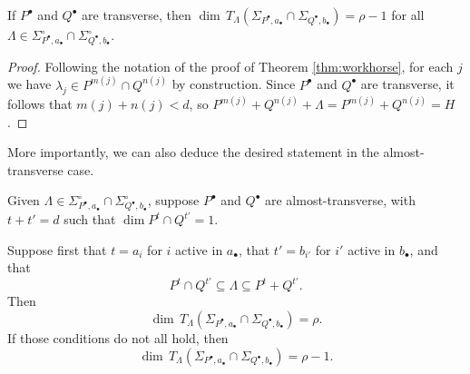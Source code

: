 \documentclass{amsart}
\begin{document}
\begin{cor}\label{cor:transverse}
If $P^{\bullet}$ and $Q^{\bullet}$ are transverse, then 
$\dim \, T_\Lambda (\Sigma_{P^{\bullet},a_{\bullet}} \cap \Sigma_{Q^{\bullet},b_{\bullet}})
= \rho-1 $ for all
$\Lambda 
\in {\Sigma}^\circ_{P^{\bullet},a_{\bullet}} \cap {\Sigma}^\circ_{Q^{\bullet},b_{\bullet}}$.
\end{cor}

\begin{proof} Following the notation of the proof of Theorem
\ref{thm:workhorse}, for each $j$ we have 
$\lambda_j  \in P^{m(j)} \cap Q^{n(j)} $ by construction. 
Since $P^{\bullet}$ and $Q^{\bullet}$ are transverse, it follows that 
$m(j) + n(j) < d$, so 
$P^{m(j)} + Q^{n(j)} + \Lambda = P^{m(j)} + Q^{n(j)} = H$.
\end{proof}

More importantly, we can also deduce the desired statement in the
almost-transverse case.

\begin{cor}\label{cor:at}
Given $\Lambda 
\in {\Sigma}^\circ_{P^{\bullet},a_{\bullet}} \cap {\Sigma}^\circ_{Q^{\bullet},b_{\bullet}}$,
suppose $P^{\bullet}$ and $Q^{\bullet}$ are almost-transverse, with $t+t'=d$ 
such that $\dim P^t \cap Q^{t'} =1$.  

Suppose first that $t=a_i$ for $i$ active in $a_{\bullet}$, that $t'=b_{i'}$ for $i'$ active in $b_{\bullet}$, and that 
$$P^t\cap Q^{t'} \subseteq \Lambda \subseteq P^t + Q^{t'}.$$ 
Then $$\dim \, 
T_\Lambda (\Sigma_{P^{\bullet},a_{\bullet}} \cap \Sigma_{Q^{\bullet},b_{\bullet}})
=\rho.$$
If those conditions do not all hold, then $$\dim \, 
T_\Lambda (\Sigma_{P^{\bullet},a_{\bullet}} \cap \Sigma_{Q^{\bullet},b_{\bullet}})
=\rho-1.$$
\end{cor}
\end{document}
